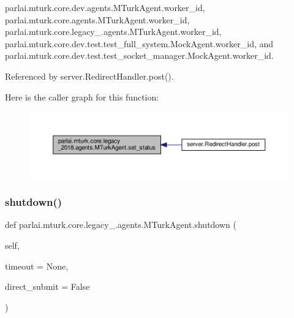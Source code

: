 parlai.\+mturk.\+core.\+dev.\+agents.\+M\+Turk\+Agent.\+worker\+\_\+id, parlai.\+mturk.\+core.\+agents.\+M\+Turk\+Agent.\+worker\+\_\+id, parlai.\+mturk.\+core.\+legacy\+\_.\+agents.\+M\+Turk\+Agent.\+worker\+\_\+id, parlai.\+mturk.\+core.\+dev.\+test.\+test\+\_\+full\+\_\+system.\+Mock\+Agent.\+worker\+\_\+id, and parlai.\+mturk.\+core.\+dev.\+test.\+test\+\_\+socket\+\_\+manager.\+Mock\+Agent.\+worker\+\_\+id.



Referenced by server.\+Redirect\+Handler.\+post().

Here is the caller graph for this function\+:
\nopagebreak
\begin{figure}[H]
\begin{center}
\leavevmode
\includegraphics[width=350pt]{classparlai_1_1mturk_1_1core_1_1legacy__2018_1_1agents_1_1MTurkAgent_aba01d9584efeeefa0db8abd7c1f1092e_icgraph}
\end{center}
\end{figure}
\mbox{\label{classparlai_1_1mturk_1_1core_1_1legacy__2018_1_1agents_1_1MTurkAgent_a13d1446c41c7342e3d23719cf190d304}} 
\subsubsection{\texorpdfstring{shutdown()}{shutdown()}}
{\footnotesize\ttfamily def parlai.\+mturk.\+core.\+legacy\+\_.\+agents.\+M\+Turk\+Agent.\+shutdown (\begin{DoxyParamCaption}\item[{}]{self,  }\item[{}]{timeout = {\ttfamily None},  }\item[{}]{direct\+\_\+submit = {\ttfamily False} }\end{DoxyParamCaption})}

